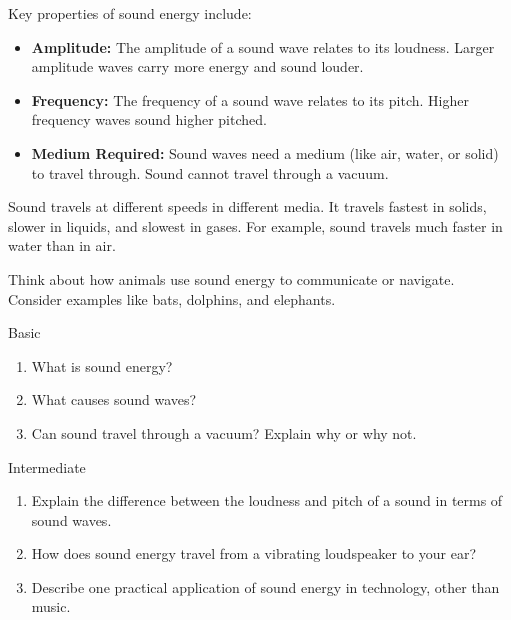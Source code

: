 Key properties of sound energy include:

\begin{itemize}
    \item \textbf{Amplitude:}  The amplitude of a sound wave relates to its loudness.  Larger amplitude waves carry more energy and sound louder.
    \item \textbf{Frequency:} The frequency of a sound wave relates to its pitch.  Higher frequency waves sound higher pitched.
    \item \textbf{Medium Required:} Sound waves need a medium (like air, water, or solid) to travel through. Sound cannot travel through a vacuum.
\end{itemize}

\begin{marginnote}
Sound travels at different speeds in different media.  It travels fastest in solids, slower in liquids, and slowest in gases.  For example, sound travels much faster in water than in air.
\end{marginnote}

\begin{stopandthink}
Think about how animals use sound energy to communicate or navigate. Consider examples like bats, dolphins, and elephants.
\end{stopandthink}


\begin{tieredquestions}{Basic}
\begin{enumerate}
    \item What is sound energy?
    \item What causes sound waves?
    \item Can sound travel through a vacuum? Explain why or why not.
\end{enumerate}
\end{tieredquestions}

\begin{tieredquestions}{Intermediate}
\begin{enumerate}
    \item Explain the difference between the loudness and pitch of a sound in terms of sound waves.
    \item How does sound energy travel from a vibrating loudspeaker to your ear?
    \item Describe one practical application of sound energy in technology, other than music.
\end{enumerate}
\end{tieredquestions}

